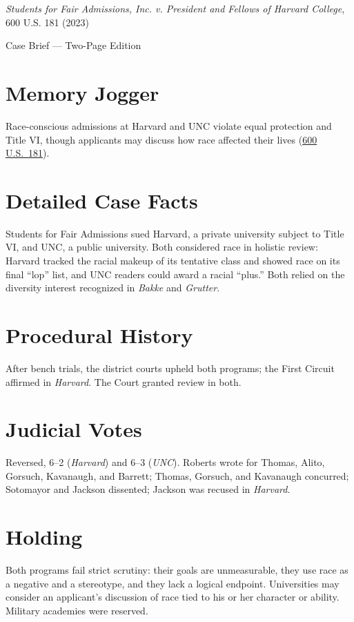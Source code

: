 \documentclass[12pt]{article}
\begin{document}
\begin{center}
{\LARGE \textit{Students for Fair Admissions, Inc. v. President and Fellows of Harvard College}, 600 U.S. 181 (2023)\par}
\vspace{0.5em}
{\large Case Brief --- Two-Page Edition\par}
\end{center}

\section{Memory Jogger}
Race-conscious admissions at Harvard and UNC violate equal protection and Title VI, though applicants may discuss how race affected their lives (\href{https://www.law.cornell.edu/supremecourt/text/20-1199}{600 U.S.\ 181}).

\section{Detailed Case Facts}
Students for Fair Admissions sued Harvard, a private university subject to Title VI, and UNC, a public university. Both considered race in holistic review: Harvard tracked the racial makeup of its tentative class and showed race on its final ``lop'' list, and UNC readers could award a racial ``plus.'' Both relied on the diversity interest recognized in \textit{Bakke} and \textit{Grutter}.

\section{Procedural History}
After bench trials, the district courts upheld both programs; the First Circuit affirmed in \textit{Harvard}. The Court granted review in both.

\section{Judicial Votes}
Reversed, 6--2 (\textit{Harvard}) and 6--3 (\textit{UNC}). Roberts wrote for Thomas, Alito, Gorsuch, Kavanaugh, and Barrett; Thomas, Gorsuch, and Kavanaugh concurred; Sotomayor and Jackson dissented; Jackson was recused in \textit{Harvard}.

\section{Holding}
Both programs fail strict scrutiny: their goals are unmeasurable, they use race as a negative and a stereotype, and they lack a logical endpoint. Universities may consider an applicant's discussion of race tied to his or her character or ability. Military academies were reserved.
\end{document}
